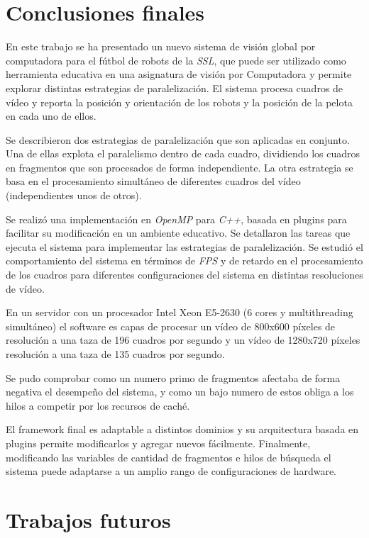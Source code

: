 
\section{Conclusiones finales}

\label{concluciones}

En este trabajo se ha presentado un nuevo sistema de visión global por
computadora para el fútbol de robots de la \emph{SSL}, que puede ser utilizado
como herramienta educativa en una asignatura de visión por Computadora y permite
explorar distintas estrategias de paralelización. El sistema procesa cuadros de
vídeo y reporta la posición y orientación de los robots y la posición de la
pelota en cada uno de ellos.

Se describieron dos estrategias de paralelización que son aplicadas en conjunto.
Una de ellas explota el paralelismo dentro de cada cuadro, dividiendo los
cuadros en fragmentos que son procesados de forma independiente. La otra
estrategia se basa en el procesamiento simultáneo de diferentes cuadros del
vídeo (independientes unos de otros).

Se realizó una implementación en \emph{OpenMP} para \emph{C++}, basada en
plugins para facilitar su modificación en un ambiente educativo. Se detallaron
las tareas que ejecuta el sistema para implementar las estrategias de
paralelización. Se estudió el comportamiento del sistema en términos de
\emph{FPS} y de retardo en el procesamiento de los cuadros para diferentes
configuraciones del sistema en distintas resoluciones de vídeo.

En un servidor con un procesador Intel Xeon E5-2630 (6 cores y multithreading
simultáneo) el software es capas de procesar un vídeo de 800x600 píxeles de
resolución a una taza de 196 cuadros por segundo y un vídeo de 1280x720 píxeles
resolución a una taza de 135 cuadros por segundo.

Se pudo comprobar como un numero primo de fragmentos afectaba de forma negativa
el desempeño del sistema, y como un bajo numero de estos obliga a los hilos a
competir por los recursos de caché.

El framework final es adaptable a distintos dominios y su arquitectura basada en
plugins permite modificarlos y agregar nuevos fácilmente. Finalmente,
modificando las variables de cantidad de fragmentos e hilos de búsqueda el
sistema puede adaptarse a un amplio rango de configuraciones de hardware.

\section{Trabajos futuros}

